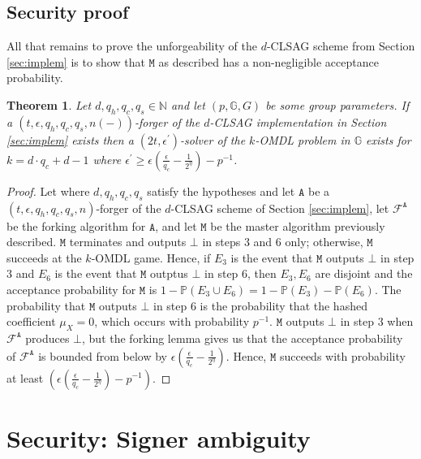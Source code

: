 \documentclass{mrl}
\theoremstyle{plain}
\newtheorem{theorem}{Theorem}[section]
\theoremstyle{definition}
\begin{document}
\subsection{Security proof}

All that remains to prove the unforgeability of the $d$-CLSAG scheme from Section \ref{sec:implem} is to show that $\texttt{M}$ as described has a non-negligible acceptance probability.

\begin{theorem}
Let $d, q_h, q_c, q_s \in \mathbb{N}$  and let $(p,\mathbb{G},G)$ be some group parameters. If a $(t, \epsilon, q_h, q_c, q_s, n(-))$-forger of the $d$-CLSAG implementation in Section \ref{sec:implem} exists then a $(2t, \epsilon^\prime)$-solver of the $k$-OMDL problem in $\mathbb{G}$ exists for $k = d\cdot q_c + d - 1$ where $\epsilon^\prime \geq \epsilon\left(\frac{\epsilon}{q_c} - \frac{1}{2^\eta}\right) - p^{-1}$.
\end{theorem}

\begin{proof}
Let where $d, q_h, q_c, q_s$ satisfy the hypotheses and let $\texttt{A}$ be a $(t, \epsilon, q_h, q_c, q_s, n)$-forger of the $d$-CLSAG scheme of Section \ref{sec:implem}, let $\mathcal{F}^{\texttt{A}}$ be the forking algorithm for $\texttt{A}$, and let $\texttt{M}$ be the master algorithm previously described. $\texttt{M}$ terminates and outputs $\bot$ in steps $3$ and $6$ only; otherwise, $\texttt{M}$ succeeds at the $k$-OMDL game. Hence, if $E_3$ is the event that $\texttt{M}$ outputs $\bot$ in step $3$ and $E_6$ is the event that $\texttt{M}$ outptus $\bot$ in step $6$, then $E_3, E_6$ are disjoint and the acceptance probability for $\texttt{M}$ is $1 - \mathbb{P}(E_3 \cup E_6) =  1 - \mathbb{P}(E_3) - \mathbb{P}(E_6)$. The probability that $\texttt{M}$ outputs $\bot$ in step $6$ is the probability that the hashed coefficient $\mu_X = 0$, which occurs with probability $p^{-1}$.  $\texttt{M}$ outputs $\bot$ in step $3$ when $\mathcal{F}^{\texttt{A}}$ produces $\bot$, but the forking lemma gives us that the acceptance probability of $\mathcal{F}^\texttt{A}$ is bounded from below by $\epsilon\left(\frac{\epsilon}{q_c} - \frac{1}{2^\eta}\right)$. Hence, $\texttt{M}$ succeeds with probability at least $ \left(\epsilon\left(\frac{\epsilon}{q_c} - \frac{1}{2^\eta}\right) - p^{-1}\right)$.
\end{proof}



\section{Security: Signer ambiguity}
\end{document}
